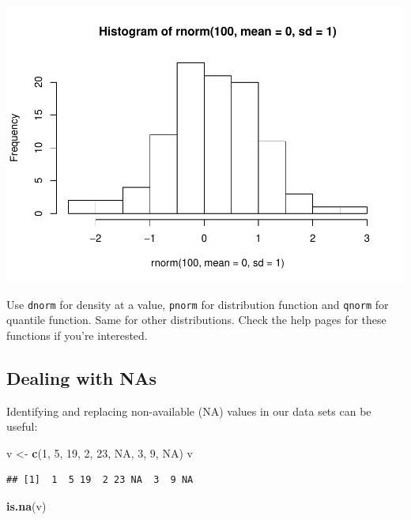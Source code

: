 \documentclass[
]{article}
\newenvironment{Shaded}{\begin{snugshade}}{\end{snugshade}}
\newcommand{\DecValTok}[1]{\textcolor[rgb]{0.00,0.00,0.81}{#1}}
\newcommand{\KeywordTok}[1]{\textcolor[rgb]{0.13,0.29,0.53}{\textbf{#1}}}
\newcommand{\NormalTok}[1]{#1}
\newcommand{\OtherTok}[1]{\textcolor[rgb]{0.56,0.35,0.01}{#1}}
\newcommand{\StringTok}[1]{\textcolor[rgb]{0.31,0.60,0.02}{#1}}
\begin{document}
\includegraphics{workshop_notebook_files/figure-latex/unnamed-chunk-8-1.pdf}

Use \texttt{dnorm} for density at a value, \texttt{pnorm} for
distribution function and \texttt{qnorm} for quantile function. Same for
other distributions. Check the help pages for these functions if you're
interested.

\hypertarget{dealing-with-nas}{%
\subsection{Dealing with NAs}\label{dealing-with-nas}}

Identifying and replacing non-available (NA) values in our data sets can
be useful:

\begin{Shaded}
\begin{Highlighting}[]
\NormalTok{v <-}\StringTok{ }\KeywordTok{c}\NormalTok{(}\DecValTok{1}\NormalTok{, }\DecValTok{5}\NormalTok{, }\DecValTok{19}\NormalTok{, }\DecValTok{2}\NormalTok{, }\DecValTok{23}\NormalTok{, }\OtherTok{NA}\NormalTok{, }\DecValTok{3}\NormalTok{, }\DecValTok{9}\NormalTok{, }\OtherTok{NA}\NormalTok{)}
\NormalTok{v}
\end{Highlighting}
\end{Shaded}

\begin{verbatim}
## [1]  1  5 19  2 23 NA  3  9 NA
\end{verbatim}

\begin{Shaded}
\begin{Highlighting}[]
\KeywordTok{is.na}\NormalTok{(v)}
\end{Highlighting}
\end{Shaded}
\end{document}
